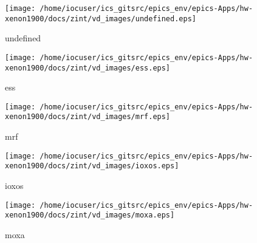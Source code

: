 \noindent
\vspace{1.4cm}
\begin{minipage}{.2\textwidth}
\begin{center}
\texttt{[image: /home/iocuser/ics\_gitsrc/epics\_env/epics-Apps/hw-xenon1900/docs/zint/vd\_images/undefined.eps]}
\end{center}
\end{minipage}
\begin{minipage}{.7\textwidth}
undefined
\end{minipage}


\noindent
\vspace{1.4cm}
\begin{minipage}{.2\textwidth}
\begin{center}
\texttt{[image: /home/iocuser/ics\_gitsrc/epics\_env/epics-Apps/hw-xenon1900/docs/zint/vd\_images/ess.eps]}
\end{center}
\end{minipage}
\begin{minipage}{.7\textwidth}
ess
\end{minipage}


\noindent
\vspace{1.4cm}
\begin{minipage}{.2\textwidth}
\begin{center}
\texttt{[image: /home/iocuser/ics\_gitsrc/epics\_env/epics-Apps/hw-xenon1900/docs/zint/vd\_images/mrf.eps]}
\end{center}
\end{minipage}
\begin{minipage}{.7\textwidth}
mrf
\end{minipage}


\noindent
\vspace{1.4cm}
\begin{minipage}{.2\textwidth}
\begin{center}
\texttt{[image: /home/iocuser/ics\_gitsrc/epics\_env/epics-Apps/hw-xenon1900/docs/zint/vd\_images/ioxos.eps]}
\end{center}
\end{minipage}
\begin{minipage}{.7\textwidth}
ioxos
\end{minipage}


\noindent
\vspace{1.4cm}
\begin{minipage}{.2\textwidth}
\begin{center}
\texttt{[image: /home/iocuser/ics\_gitsrc/epics\_env/epics-Apps/hw-xenon1900/docs/zint/vd\_images/moxa.eps]}
\end{center}
\end{minipage}
\begin{minipage}{.7\textwidth}
moxa
\end{minipage}


